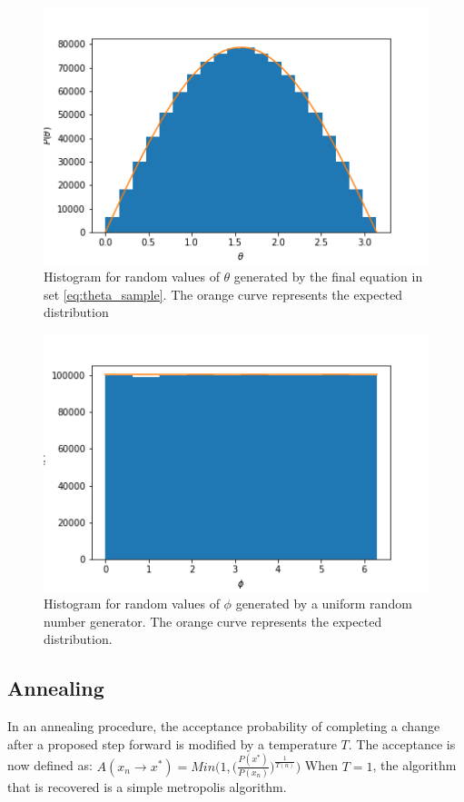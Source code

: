 \documentclass[twocolumn]{article}
\begin{document}
\begin{figure}
\centering
\includegraphics[width=\linewidth]{fig7}
\caption{Histogram for random values of $\theta$ generated by the final equation in set \ref{eq:theta_sample}. The orange curve represents the expected distribution}
\label{fig:fig7}
\end{figure}

\begin{figure}
	\centering
	\includegraphics[width=\linewidth]{fig8}
	\caption{Histogram for random values of $\phi$ generated by a uniform random number generator. The orange curve represents the expected distribution.}
	\label{fig:fig8}
\end{figure}

\subsection{Annealing}
In an annealing procedure, the acceptance probability of completing a change after a proposed step forward is modified by a temperature $T$. The acceptance is now defined as:
$A(x_n \to x^*) = Min \Bigg( 1, \Big( \frac{P(x^*)}{P(x_n)}\Big) ^{ \frac{1}{T(n)} } \Bigg)$
When $T=1$, the algorithm that is recovered is a simple metropolis algorithm. 
\end{document}
